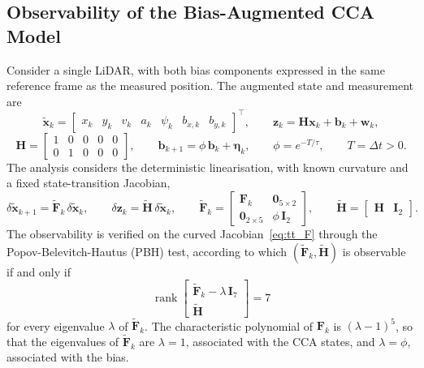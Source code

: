 \subsection*{Observability of the Bias-Augmented CCA Model}
\label{app:obs}

Consider a single LiDAR, with both bias components expressed in the same reference frame as
the measured position. The augmented state and measurement are
\begin{equation}
    \tilde{\mathbf{x}}_k =
    \begin{bmatrix} x_k & y_k & v_k & a_k & \psi_k & b_{x,k} & b_{y,k} \end{bmatrix}^\top,
    \qquad
    \mathbf{z}_k = \mathbf{H}\mathbf{x}_k + \mathbf{b}_k + \mathbf{w}_k,
\end{equation}
\begin{equation}
    \mathbf{H} =
    \begin{bmatrix}
        1 & 0 & 0 & 0 & 0 \\
        0 & 1 & 0 & 0 & 0
    \end{bmatrix},
    \qquad
    \mathbf{b}_{k+1} = \phi\,\mathbf{b}_k + \boldsymbol{\eta}_k,
    \qquad
    \phi = e^{-T/\tau},
    \qquad
    T = \Delta t > 0.
\end{equation}
The analysis considers the deterministic linearisation, with known curvature and a fixed
state-transition Jacobian,
\begin{equation}
    \delta\tilde{\mathbf{x}}_{k+1} = \tilde{\mathbf{F}}_k\,\delta\tilde{\mathbf{x}}_k,
    \qquad
    \delta\mathbf{z}_k = \tilde{\mathbf{H}}\,\delta\tilde{\mathbf{x}}_k,
    \qquad
    \tilde{\mathbf{F}}_k =
    \begin{bmatrix}
        \mathbf{F}_k & \mathbf{0}_{5\times2} \\
        \mathbf{0}_{2\times5} & \phi\,\mathbf{I}_2
    \end{bmatrix},
    \qquad
    \tilde{\mathbf{H}} = \begin{bmatrix} \mathbf{H} & \mathbf{I}_2 \end{bmatrix}.
\end{equation}
The observability is verified on the curved Jacobian~\eqref{eq:tt_F} through the
Popov-Belevitch-Hautus (PBH) test, according to which $(\tilde{\mathbf{F}}_k, \tilde{\mathbf{H}})$
is observable if and only if
\begin{equation}
    \operatorname{rank}
    \begin{bmatrix}
        \tilde{\mathbf{F}}_k - \lambda\,\mathbf{I}_7 \\
        \tilde{\mathbf{H}}
    \end{bmatrix}
    = 7
    \label{eq:pbh}
\end{equation}
for every eigenvalue $\lambda$ of $\tilde{\mathbf{F}}_k$. The characteristic polynomial of
$\mathbf{F}_k$ is $(\lambda - 1)^5$, so that the eigenvalues of $\tilde{\mathbf{F}}_k$ are
$\lambda = 1$, associated with the CCA states, and $\lambda = \phi$, associated with the bias.

